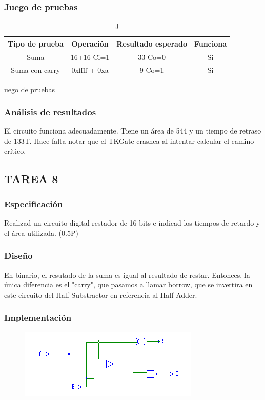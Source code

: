 \documentclass{article}
\begin{document}
		\subsubsection*{Juego de pruebas}
		\begin{table}[h]
			\begin{center}
				\begin{tabular}{| c | c | c | c |}
					\hline
					Tipo de prueba & Operación & Resultado esperado & Funciona \\ \hline
						
					Suma & 16+16 Ci=1 & 33 Co=0 & Si \\ \hline
					Suma con carry & 0xffff + 0xa & 9 Co=1 & Si \\ \hline
	
				\end{tabular}
				\caption Juego de pruebas
			\end{center}
		\end{table}



		\subsubsection*{Análisis de resultados}
		El circuito funciona adecuadamente. Tiene un área de 544 y un tiempo de retraso de 133T. Hace falta notar que el TKGate crashea al intentar calcular el camino crítico.  

	
	\subsection{TAREA 8}
		\subsubsection*{Especificación}
		Realizad un circuito digital restador de 16 bits e indicad los tiempos de retardo y el área
		utilizada. (0.5P)

		\subsubsection*{Diseño}
		En binario, el resutado de la suma es igual al resultado de restar. Entonces, la única diferencia es el "carry", que pasamos a llamar borrow, que se invertira en este circuito del Half Substractor en referencia al Half Adder.


		\subsubsection*{Implementación}
		 \begin{figure}[ht]
			\includegraphics[width=0.8\linewidth]{HS}
			\centering
		 \end{figure}
\end{document}
